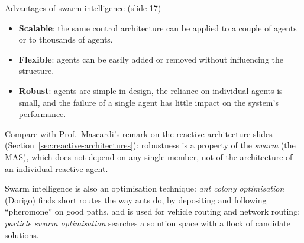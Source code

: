 \begin{nbfact}{Advantages of swarm intelligence (slide 17)}
\begin{itemize}[nosep]
  \item \textbf{Scalable}: the same control architecture can be applied to a couple of
        agents or to thousands of agents.
  \item \textbf{Flexible}: agents can be easily added or removed without influencing the
        structure.
  \item \textbf{Robust}: agents are simple in design, the reliance on individual agents is
        small, and the failure of a single agent has little impact on the system's
        performance.
\end{itemize}
\end{nbfact}

\begin{nbintuition}
Compare with Prof.\ Mascardi's remark on the reactive-architecture slides
(Section~\ref{sec:reactive-architectures}): robustness is a property of the \emph{swarm}
(the MAS), which does not depend on any single member, not of the architecture of an
individual reactive agent.
\end{nbintuition}

\begin{nbwhy}
\notinslides
Swarm intelligence is also an optimisation technique: \emph{ant colony optimisation}
(Dorigo) finds short routes the way ants do, by depositing and following ``pheromone'' on
good paths, and is used for vehicle routing and network routing; \emph{particle swarm
optimisation} searches a solution space with a flock of candidate solutions.
\end{nbwhy}
